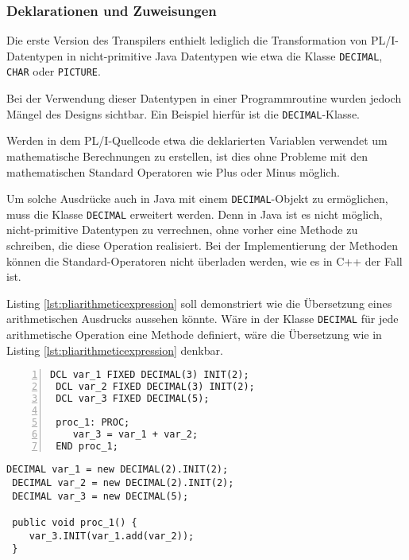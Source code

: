 \subsubsection{Deklarationen und Zuweisungen}
Die erste Version des Transpilers enthielt lediglich die Transformation von PL/I-Datentypen in nicht-primitive Java Datentypen wie etwa die Klasse \verb+DECIMAL+, \verb+CHAR+ oder \verb+PICTURE+.


Bei der Verwendung dieser Datentypen in einer Programmroutine wurden jedoch Mängel des Designs sichtbar. Ein Beispiel hierfür ist die \verb+DECIMAL+-Klasse.

Werden in dem PL/I-Quellcode etwa die deklarierten Variablen verwendet um mathematische Berechnungen zu erstellen, ist dies ohne Probleme mit den mathematischen Standard Operatoren wie Plus oder Minus möglich.

Um solche Ausdrücke auch in Java mit einem \verb+DECIMAL+-Objekt zu ermöglichen, muss die Klasse \verb+DECIMAL+ erweitert werden.
Denn in Java ist es nicht möglich, nicht-primitive Datentypen zu verrechnen, ohne vorher eine Methode zu schreiben, die diese Operation realisiert. 
Bei der Implementierung der Methoden können die Standard-Operatoren nicht überladen werden, wie es in C++ der Fall ist.

Listing \ref{lst:pliarithmeticexpression} soll demonstriert wie die Übersetzung eines arithmetischen Ausdrucks aussehen könnte.
Wäre in der Klasse \verb+DECIMAL+ für jede arithmetische Operation eine Methode definiert, wäre die Übersetzung wie in Listing \ref{lst:pliarithmeticexpression} denkbar.

\begin{minipage}[b]{0.48\linewidth}{\newline}
	\centering
	\lstset{language=PL/I}
	\begin{lstlisting}[frame=single, numbers=left, mathescape,%
		caption={Transformation DECIMAL}, label={lst:pliarithmeticexpression}, basicstyle=\fontsize{9}{13}\selectfont\ttfamily]
 DCL var_1 FIXED DECIMAL(3) INIT(2);
 DCL var_2 FIXED DECIMAL(3) INIT(2);
 DCL var_3 FIXED DECIMAL(5);
		
 proc_1: PROC;
	var_3 = var_1 + var_2;
 END proc_1;
	\end{lstlisting}
\end{minipage}
\hspace{0.5cm}
\begin{minipage}[b]{0.48\linewidth}
	\centering
	\lstset{language=Java}
	\begin{lstlisting}[frame=single, mathescape,%
		title={" "}, basicstyle=\fontsize{9}{13}\selectfont\ttfamily]
 DECIMAL var_1 = new DECIMAL(2).INIT(2);
 DECIMAL var_2 = new DECIMAL(2).INIT(2);
 DECIMAL var_3 = new DECIMAL(5);
		
 public void proc_1() {
	var_3.INIT(var_1.add(var_2));
 }
	\end{lstlisting}
\end{minipage}

